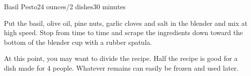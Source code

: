 \documentclass[../Cookbook.tex]{subfiles}
\begin{document}
\begin{recipe}[Pesto]{Basil Pesto}{24 ounces/2 dishes}{30 minutes}

Put the basil, olive oil, pine nuts, garlic cloves and salt in the blender and mix at high speed.
Stop from time to time and scrape the ingredients down toward the bottom of the blender cup with a rubber spatula.

\newstep
At this point, you may want to divide the recipe. Half the recipe is good for a dish made for 4 people. Whatever remains can easily be frozen and used later.


\end{recipe}
\end{document}
